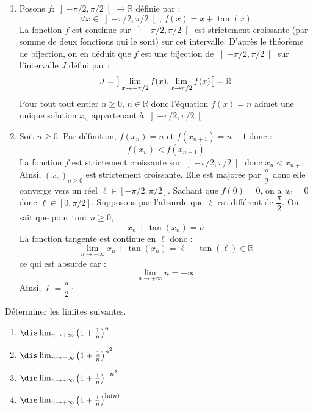 \documentclass[a4paper,10pt]{report}
\begin{document}
\begin{enumerate}
\item Posons $f : \left] { - \pi  / 2,\pi  / 2} \right[ \rightarrow \mathbb{R}$ définie par :
$$ \forall x \in \left] { - \pi  / 2,\pi  / 2} \right[, \, f(x) = x+ \tan(x)$$
La fonction $f$ est continue sur $\left] { - \pi  / 2,\pi  / 2} \right[$ est strictement croissante (par somme de deux fonctions qui le sont) sur cet intervalle. D'après le théorème de bijection, on en déduit que $f$ est une bijection de $\left] { - \pi  / 2,\pi  / 2} \right[$ sur l'intervalle $J$ défini par :
$$ J = \big{]} \lim_{x \rightarrow - \pi/2} f(x), \lim_{x \rightarrow \pi/2} f(x) \big{[} = \mathbb{R}$$
Pour tout tout entier $n \geq 0$, $n \in \mathbb{R}$ donc l'équation $f(x)=n$ admet une unique solution $x_n$ appartenant à $\left] { - \pi  / 2,\pi  / 2} \right[$.
\item Soit $n \geq 0$. Par définition, $f(x_n) =n$ et $f(x_{n+1})=n+1$ donc :
$$ f(x_n) < f(x_{n+1})$$
La fonction $f$ est strictement croissante sur $\left] { - \pi  / 2,\pi  / 2} \right[$ donc $x_n < x_{n+1}$. Ainsi, $(x_n)_{n \geq 0}$ est strictement croissante. Elle est majorée par $\dfrac{\pi}{2}$ donc elle converge vers un réel $\ell \in \left[ { - \pi  / 2,\pi  / 2} \right]$. Sachant que $f(0)=0$, on a $u_0=0$ donc $\ell \in \left[ {0,\pi  / 2} \right]$. Supposons par l'absurde que $\ell$ est différent de $\dfrac{\pi}{2}$. On sait que pour tout $n \geq 0$,
$$ x_n + \tan(x_n) = n$$
La fonction tangente est continue en $\ell$ donc :
$$ \lim_{n \rightarrow + \infty} x_n + \tan(x_n) = \ell + \tan(\ell) \in \mathbb{R}$$
ce qui est absurde car :
$$ \lim_{n \rightarrow + \infty} n = + \infty$$
Ainsi, $\ell = \dfrac{\pi}{2}\cdot$
\end{enumerate}
\medskip

\begin{Exercice}{} Déterminer les limites suivantes. 

\begin{multicols}{2}
\begin{enumerate}
\item $\dis \lim_{n \rightarrow + \infty} \left(1+ \frac{1}{n}\right)^n$
\item $\dis \lim_{n \rightarrow + \infty} \left(1+ \frac{1}{n}\right)^{n^2}$
\columnbreak
\item $\dis \lim_{n \rightarrow + \infty} \left(1+ \frac{1}{n}\right)^{-n^2}$
\item $\dis \lim_{n \rightarrow + \infty} \left(1+ \frac{1}{n}\right)^{\ln(n)}$
\end{enumerate}
\end{multicols}
\vspace{0.1cm}
\end{Exercice} 
\end{document}
